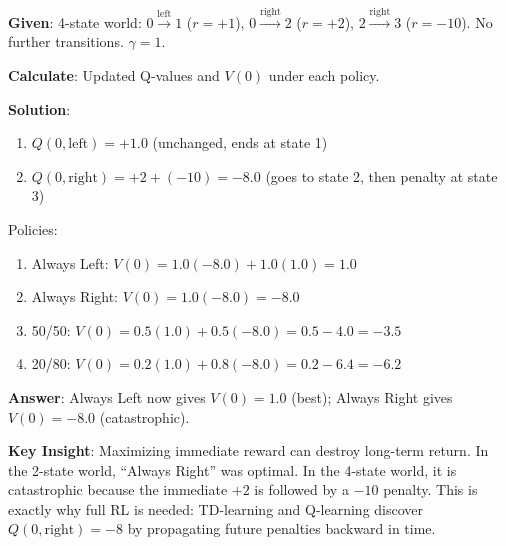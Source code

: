 \documentclass[11pt,a4paper]{article}
\begin{document}
\begin{tcolorbox}[colback=green!5!white,colframe=green!75!black,title=\textbf{Worked Example 20: Value Function with Future Consequences}]
\textbf{Given}: 4-state world: $0 \xrightarrow{\text{left}} 1$ ($r=+1$), $0 \xrightarrow{\text{right}} 2$ ($r=+2$), $2 \xrightarrow{\text{right}} 3$ ($r=-10$). No further transitions. $\gamma = 1$.

\textbf{Calculate}: Updated Q-values and $V(0)$ under each policy.

\textbf{Solution}:
\begin{enumerate}
    \item $Q(0, \text{left}) = +1.0$ (unchanged, ends at state 1)
    \item $Q(0, \text{right}) = +2 + (-10) = -8.0$ (goes to state 2, then penalty at state 3)
\end{enumerate}

Policies:
\begin{enumerate}
    \item Always Left: $V(0) = 1.0(-8.0) + 1.0(1.0) = 1.0$
    \item Always Right: $V(0) = 1.0(-8.0) = -8.0$
    \item 50/50: $V(0) = 0.5(1.0) + 0.5(-8.0) = 0.5 - 4.0 = -3.5$
    \item 20/80: $V(0) = 0.2(1.0) + 0.8(-8.0) = 0.2 - 6.4 = -6.2$
\end{enumerate}

\textbf{Answer}: Always Left now gives $V(0) = 1.0$ (best); Always Right gives $V(0) = -8.0$ (catastrophic).

\textbf{Key Insight}: Maximizing immediate reward can destroy long-term return. In the 2-state world, ``Always Right'' was optimal. In the 4-state world, it is catastrophic because the immediate $+2$ is followed by a $-10$ penalty. This is exactly why full RL is needed: TD-learning and Q-learning discover $Q(0,\text{right}) = -8$ by propagating future penalties backward in time.
\end{tcolorbox}
\end{document}

